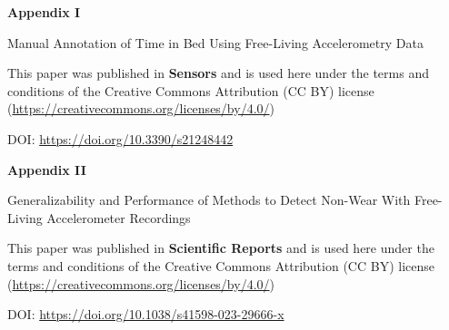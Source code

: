 \documentclass[
  10pt,
]{scrbook}
\begin{document}
\newpage

\begin{center}

\textbf{\textsf{\Huge Appendix I}}



\vspace{2cm}

\textsf{\Huge Manual Annotation of Time in Bed Using Free-Living Accelerometry Data}

\vspace{5cm}

This paper was published in \textbf{Sensors} and is used here under the terms and conditions of the Creative Commons Attribution (CC BY) license (\href{https://creativecommons.org/licenses/by/4.0/}{https://creativecommons.org/licenses/by/4.0/})

\vspace{1cm}

DOI: \href{https://doi.org/10.3390/s21248442}{https://doi.org/10.3390/s21248442}

\end{center}



\begin{center}

\textbf{\textsf{\Huge Appendix II}}



\vspace{2cm}

\textsf{\Huge Generalizability and Performance of Methods to Detect Non-Wear With Free-Living Accelerometer Recordings}

\vspace{5cm}

This paper was published in \textbf{Scientific Reports} and is used here under the terms and conditions of the Creative Commons Attribution (CC BY) license (\href{https://creativecommons.org/licenses/by/4.0/}{https://creativecommons.org/licenses/by/4.0/})

\vspace{1cm}

DOI: \href{https://doi.org/10.1038/s41598-023-29666-x}{https://doi.org/10.1038/s41598-023-29666-x}

\end{center}
\end{document}
